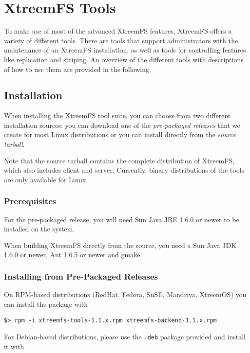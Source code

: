\documentclass[a4paper,10pt]{book}
\begin{document}
\chapter{XtreemFS Tools}

To make use of most of the advanced XtreemFS features, XtreemFS offers a variety of different tools. There are tools that support administrators with the maintenance of an XtreemFS installation, as well as tools for controlling features like replication and striping. An overview of the different tools with descriptions of how to use them are provided in the following.

\section{Installation}

When installing the XtreemFS tool suite, you can choose from two different installation sources: you can download one of the \emph{pre-packaged releases} that we create for most Linux distributions or you can install directly from the \emph{source tarball}.

Note that the source tarball contains the complete distribution of XtreemFS, which also includes client and server. Currently, binary distributions of the tools are only available for Linux.

\subsection{Prerequisites}

For the pre-packaged release, you will need Sun Java JRE 1.6.0 or newer to be installed on the system.

When building XtreemFS directly from the source, you need a Sun Java JDK 1.6.0 or newer, Ant 1.6.5 or newer and gmake.

\subsection{Installing from Pre-Packaged Releases}

On RPM-based distributions (RedHat, Fedora, SuSE, Mandriva, XtreemOS) you can install the package with


\begin{verbatim}
$> rpm -i xtreemfs-tools-1.1.x.rpm xtreemfs-backend-1.1.x.rpm
\end{verbatim}


For Debian-based distributions, please use the \texttt{.deb} package provided and install it with
\end{document}
